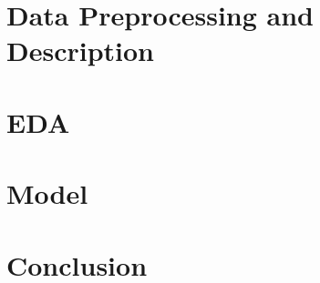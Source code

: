 \documentclass[a4paper,10pt]{extarticle}
\begin{document}
\section{Data Preprocessing and Description}

\section{EDA}

\section{Model}

\section{Conclusion}

\cleardoublepage
{}
{}

\end{document}
